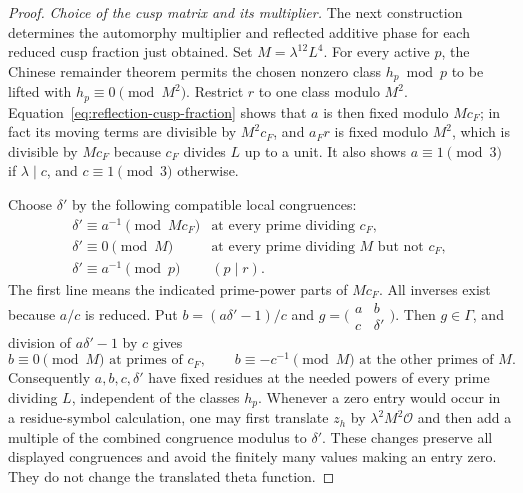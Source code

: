 \documentclass[11pt,a4paper]{article}
\numberwithin{equation}{section}
\numberwithin{figure}{section}
\theoremstyle{definition}
\theoremstyle{remark}
\begin{document}
\begin{proof}
\emph{Choice of the cusp matrix and its multiplier.}
The next construction determines the automorphy multiplier and reflected
additive phase for each reduced cusp fraction just obtained.
Set $M=\lambda^{12}L^4$.  For every active $p$, the Chinese remainder
theorem permits the chosen nonzero class $h_p\bmod p$ to be lifted with
$h_p\equiv0\pmod{M^2}$.  Restrict $r$ to one class modulo $M^2$.
Equation~\eqref{eq:reflection-cusp-fraction} shows that $a$ is then
fixed modulo $Mc_F$; in fact its moving terms are divisible by
$M^2c_F$, and $a_Fr$ is fixed modulo $M^2$, which is divisible by
$Mc_F$ because $c_F$ divides $L$ up to a unit.
It also shows $a\equiv1\pmod3$ if $\lambda\mid c$, and
$c\equiv1\pmod3$ otherwise.

Choose $\delta'$ by the following compatible local congruences:
\[
 \begin{array}{ll}
 \delta'\equiv a^{-1}\pmod{Mc_F}
       &\text{at every prime dividing }c_F,\\
 \delta'\equiv0\pmod M
       &\text{at every prime dividing }M\text{ but not }c_F,\\
 \delta'\equiv a^{-1}\pmod p& (p\mid r).
 \end{array}
\]
The first line means the indicated prime-power parts of $Mc_F$.
All inverses exist because $a/c$ is reduced.  Put
$b=(a\delta'-1)/c$ and $g=\bigl(\begin{smallmatrix}a&b\\c&\delta'\end{smallmatrix}\bigr)$.
Then $g\in\Gamma$, and division of $a\delta'-1$ by $c$ gives
\[
 b\equiv0\pmod M\text{ at primes of }c_F,\qquad
 b\equiv-c^{-1}\pmod M\text{ at the other primes of }M.
\]
Consequently $a,b,c,\delta'$ have fixed residues at the needed powers
of every prime dividing $L$, independent of the classes $h_p$.
Whenever a zero entry would occur in a residue-symbol calculation,
one may first translate $z_h$ by $\lambda^2M^2\mathcal O$ and then
add a multiple of the combined congruence modulus to $\delta'$.
These changes preserve all displayed congruences and avoid the finitely
many values making an entry zero.  They do not change the translated
theta function.


\end{proof}
\end{document}
